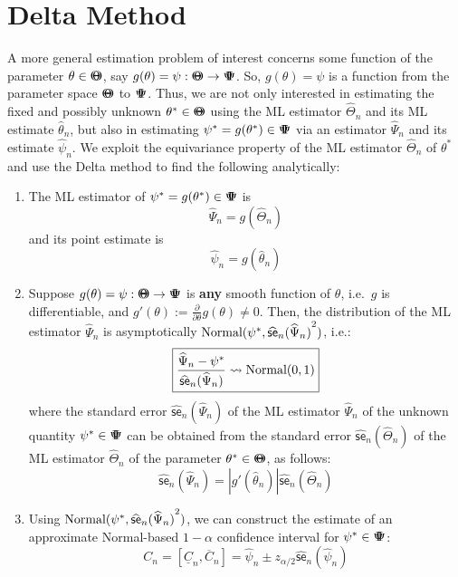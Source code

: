 \section{Delta Method}\label{S:DeltaMethod}
A more general estimation problem of interest concerns some function of the parameter $\theta \in {\Theta}\mspace{-11 mu}{\Theta}$, say $g(\theta)=\psi:{\Theta}\mspace{-11 mu}{\Theta} \to {\Psi}\mspace{-11 mu}{\Psi}$.  So, $g(\theta)=\psi$ is a function from the parameter space ${\Theta}\mspace{-11 mu}{\Theta}$ to ${\Psi}\mspace{-11 mu}{\Psi}$.  Thus, we are not only interested in estimating the fixed and possibly unknown $\theta^* \in {\Theta}\mspace{-11 mu}{\Theta}$ using the ML estimator $\widehat{\Theta}_n$ and its ML estimate $\widehat{\theta}_n$, but also in estimating $\psi^* = g(\theta^*) \in {\Psi}\mspace{-11 mu}{\Psi}$ via an estimator $\widehat{\Psi}_n$ and its estimate $\widehat{\psi}_n$.  We exploit the equivariance property of the ML estimator $\widehat{\Theta}_n$ of $\theta^*$ and use the Delta method to find the following analytically:
\begin{enumerate}
\item The ML estimator of $\psi^*=g(\theta^*) \in {\Psi}\mspace{-11 mu}{\Psi}$ is 
$$\boxed{\widehat{\Psi}_n = g(\widehat{\Theta}_n)}$$ 
and its point estimate is 
$$\boxed{\widehat{\psi}_n=g(\widehat{\theta}_n)}$$
\item Suppose $g(\theta)=\psi:{\Theta}\mspace{-11 mu}{\Theta} \to {\Psi}\mspace{-11 mu}{\Psi}$ is {\bf any} smooth function of $\theta$, i.e.~$g$ is differentiable, and $g'(\theta) := \frac{\partial}{\partial \theta}g(\theta) \neq 0$.  Then, the distribution of the ML estimator $\widehat{\Psi}_n$ is asymptotically $\mbox{{\rm Normal}}(\psi^*, {\widehat{\mathsf{se}}_n(\widehat{\Psi}_n)}^2)$, i.e.:
\[
\boxed{
\frac{\widehat{\Psi}_n - \psi^*}{\widehat{\mathsf{se}}_n(\widehat{\Psi}_n)} \rightsquigarrow
\mbox{{\rm Normal}}(0,1)
}
\]
where the standard error $\widehat{\mathsf{se}}_n(\widehat{\Psi}_n)$ of the ML estimator $\widehat{\Psi}_n$ of the unknown quantity $\psi^* \in {\Psi}\mspace{-11 mu}{\Psi}$ can be obtained from the standard error $\widehat{\mathsf{se}}_n(\widehat{\Theta}_n)$ of the ML estimator $\widehat{\Theta}_n$ of the parameter $\theta^* \in {\Theta}\mspace{-11 mu}{\Theta}$, as follows:
\[
\boxed{
\widehat{\mathsf{se}}_n(\widehat{\Psi}_n) = |g'(\widehat{\theta}_n)| \widehat{\mathsf{se}}_n(\widehat{\Theta}_n)
}
\]
\item Using $\mbox{{\rm Normal}}(\psi^*, {\widehat{\mathsf{se}}_n(\widehat{\Psi}_n)}^2)$, we can construct the estimate of an approximate Normal-based $1-\alpha$ confidence interval for $\psi^* \in {\Psi}\mspace{-11 mu}{\Psi}$:
\[
\boxed{
C_n  =[\underline{C}_n, \overline{C}_n]= \widehat{\psi}_n \pm z_{\alpha/2} {\widehat{\mathsf{se}}_n(\widehat{\psi}_n)}
}
\]
\end{enumerate}

